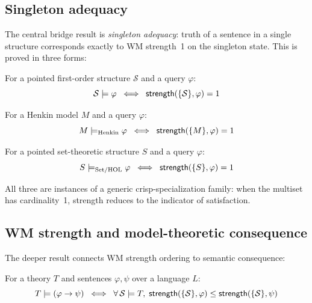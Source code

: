 \documentclass[11pt,openany]{report}
\begin{document}
\subsection{Singleton adequacy}

The central bridge result is \emph{singleton adequacy}: truth of a
sentence in a single structure corresponds exactly to WM strength~1
on the singleton state.  This is proved in three forms:

\begin{theorem}
For a pointed first-order structure $\mathcal{S}$ and a query
$\varphi$:
\[
  \mathcal{S} \models \varphi
  \;\;\Longleftrightarrow\;\;
  \mathsf{strength}(\{\mathcal{S}\}, \varphi) = 1
\]
\end{theorem}

\begin{theorem}
For a Henkin model $M$ and a query $\varphi$:
\[
  M \models_{\mathrm{Henkin}} \varphi
  \;\;\Longleftrightarrow\;\;
  \mathsf{strength}(\{M\}, \varphi) = 1
\]
\end{theorem}

\begin{theorem}
For a pointed set-theoretic structure $S$ and a query $\varphi$:
\[
  S \models_{\mathrm{Set/HOL}} \varphi
  \;\;\Longleftrightarrow\;\;
  \mathsf{strength}(\{S\}, \varphi) = 1
\]
\end{theorem}

\noindent
All three are instances of a generic crisp-specialization family: when
the multiset has cardinality~1, strength reduces to the indicator of
satisfaction.

\subsection{WM strength and model-theoretic consequence}

The deeper result connects WM strength ordering to semantic
consequence:

\begin{theorem}
\label{thm:consequence-strength}
For a theory $T$ and sentences $\varphi, \psi$ over a language $L$:
\[
  T \models (\varphi \to \psi)
  \;\;\Longleftrightarrow\;\;
  \forall\, \mathcal{S} \models T,\;
  \mathsf{strength}(\{\mathcal{S}\}, \varphi)
  \le \mathsf{strength}(\{\mathcal{S}\}, \psi)
\]
\end{theorem}
\end{document}
